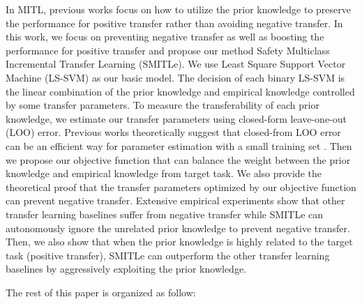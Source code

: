 In MITL, previous works focus on how to utilize the prior knowledge to preserve the performance for positive transfer rather than avoiding negative transfer. In this work, we focus on preventing negative transfer as well as boosting the performance for positive transfer and propose our method Safety Multiclass Incremental Transfer Learning (SMITLe). 
We use Least Square Support Vector Machine (LS-SVM) \cite{suykens1999least} as our basic model. The decision of each binary LS-SVM is the linear combination of the prior knowledge and empirical knowledge controlled by some transfer parameters. To measure the transferability of each prior knowledge, we estimate our transfer parameters using closed-form leave-one-out (LOO) error. Previous works theoretically suggest that closed-from LOO error can be an efficient way for parameter estimation with a small training set \cite{kuzborskij2013stability} \cite{cawley2006leave}. Then we propose our objective function that can balance the weight between the prior knowledge and empirical knowledge from target task. We also provide the theoretical proof that the transfer parameters optimized by our objective function can prevent negative transfer. Extensive empirical experiments show that other transfer learning baselines suffer from negative transfer while SMITLe can autonomously ignore the unrelated prior knowledge to prevent negative transfer. Then, we also show that when the prior knowledge is highly related to the target task (positive transfer), SMITLe can outperform the other transfer learning baselines by aggressively exploiting the prior knowledge.

The rest of this paper is organized as follow:
  


